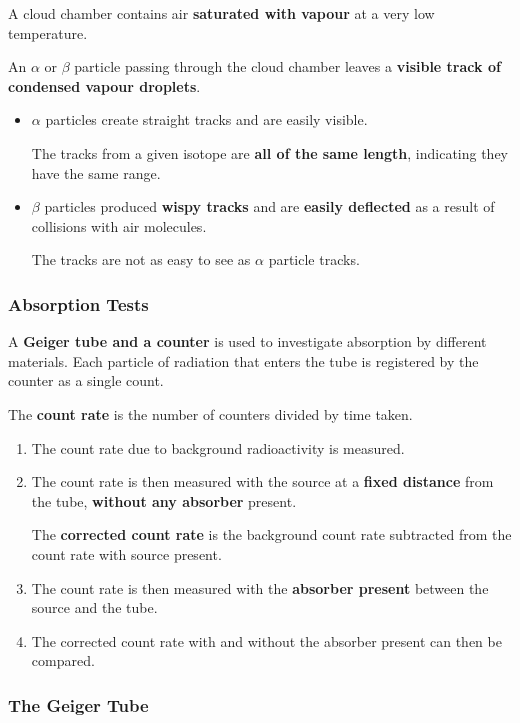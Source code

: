 A cloud chamber contains air \textbf{saturated with vapour} at a very low temperature.

An $\alpha$ or $\beta$ particle passing through the cloud chamber leaves a \textbf{visible track of condensed vapour droplets}.
\begin{itemize}
    \item $\alpha$ particles create straight tracks and are easily visible.

        The tracks from a given isotope are \textbf{all of the same length}, indicating they have the same range.
    \item $\beta$ particles produced \textbf{wispy tracks} and are \textbf{easily deflected} as a result of collisions with air molecules.

        The tracks are not as easy to see as $\alpha$ particle tracks.
\end{itemize}

\subsubsection*{Absorption Tests}

A \textbf{Geiger tube and a counter} is used to investigate absorption by different materials. Each particle of radiation that enters the tube is registered by the counter as a single count.

The \textbf{count rate} is the number of counters divided by time taken.
\begin{enumerate}
    \item The count rate due to background radioactivity is measured.
    \item The count rate is then measured with the source at a \textbf{fixed distance} from the tube, \textbf{without any absorber} present.

        The \textbf{corrected count rate} is the background count rate subtracted from the count rate with source present.
    \item The count rate is then measured with the \textbf{absorber present} between the source and the tube.
    \item The corrected count rate with and without the absorber present can then be compared.
\end{enumerate}

\subsubsection*{The Geiger Tube}


